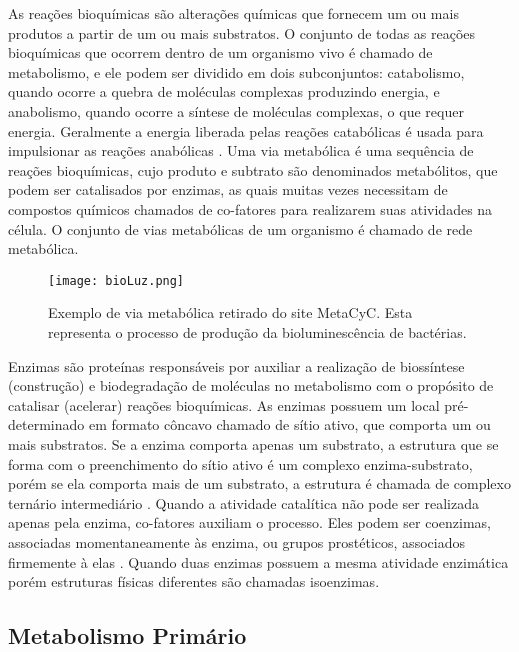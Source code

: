 
\indent As reações bioquímicas são alterações químicas que fornecem um ou mais produtos a partir de um ou mais substratos. O conjunto de todas as reações bioquímicas que ocorrem dentro de um organismo vivo é chamado de metabolismo, e ele podem ser dividido em dois subconjuntos: catabolismo, quando ocorre a quebra de moléculas complexas produzindo energia, e anabolismo, quando ocorre a síntese de moléculas complexas, o que requer energia. Geralmente a energia liberada pelas reações catabólicas é usada para impulsionar as reações anabólicas \cite{carterClass}.
Uma via metabólica é uma sequência de reações bioquímicas, cujo produto e subtrato são denominados metabólitos, que podem ser catalisados por enzimas, as quais muitas vezes necessitam de compostos químicos chamados de co-fatores para realizarem suas atividades na célula. O conjunto de vias metabólicas de um organismo é chamado de rede metabólica.

\begin{figure}[h]
    \centering
    \texttt{[image: bioLuz.png]}
    \caption{Exemplo de via metabólica retirado do site MetaCyC. Esta representa o processo de produção da bioluminescência de bactérias. \cite{examplePathway} }
    \label{fig:EstruturasDoDNA}
\end{figure} 

\indent Enzimas são proteínas responsáveis por auxiliar a realização de biossíntese (construção) e biodegradação de moléculas no metabolismo com o propósito de catalisar (acelerar) reações bioquímicas. As enzimas possuem um local pré-determinado em formato côncavo chamado de sítio ativo, que comporta um ou mais substratos. Se a enzima comporta apenas um substrato, a estrutura que se forma com o preenchimento do sítio ativo é um complexo enzima-substrato, porém se ela comporta mais de um substrato, a estrutura é chamada de complexo ternário intermediário \cite{Cap2schomburg}. Quando a atividade catalítica não pode ser realizada apenas pela enzima, co-fatores auxiliam o processo. Eles podem ser coenzimas, associadas momentaneamente às enzima, ou grupos prostéticos, associados firmemente à elas \cite{Cap2schomburg}. Quando duas enzimas possuem a mesma atividade enzimática porém estruturas físicas diferentes são chamadas isoenzimas\cite{Cap2schomburg}.


\subsection{Metabolismo Primário}



